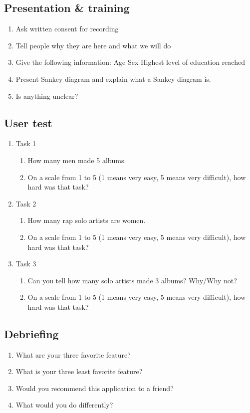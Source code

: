 \documentclass{article}
\begin{document}
\subsection{Presentation \& training}
\begin{enumerate}
    \item Ask written consent for recording
    \item Tell people why they are here and what we will do
    \item Give the following information:
          \subitem Age
          \subitem Sex
          \subitem Highest level of education reached
    \item Present Sankey diagram and explain what a Sankey diagram is.
    \item Is anything unclear?
\end{enumerate}

\subsection{User test}
\begin{enumerate}
    \item Task 1
          \begin{enumerate}
              \item How many men made 5 albums.
              \item On a scale from 1 to 5 (1 means very easy, 5 means very difficult), how hard was that task?
          \end{enumerate}
    \item Task 2
          \begin{enumerate}
              \item How many rap solo artists are women.
              \item On a scale from 1 to 5 (1 means very easy, 5 means very difficult), how hard was that task?
          \end{enumerate}
    \item Task 3
          \begin{enumerate}
              \item Can you tell how many solo artists made 3 albums? Why/Why not?
              \item On a scale from 1 to 5 (1 means very easy, 5 means very difficult), how hard was that task?
          \end{enumerate}
\end{enumerate}

\subsection{Debriefing}
\begin{enumerate}
    \item What are your three favorite feature?
    \item What is your three least favorite feature?
    \item Would you recommend this application to a friend?
    \item What would you do differently?
\end{enumerate}
\end{document}
